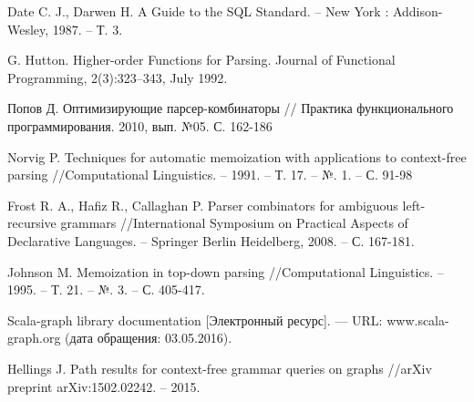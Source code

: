 \begin{thebibliography}{99}
Date C. J., Darwen H. A Guide to the SQL Standard. – New York :
Addison-Wesley, 1987. – Т. 3. 

G. Hutton. Higher-order Functions for Parsing. Journal of Functional
Programming, 2(3):323–343, July 1992.

Попов Д. Оптимизирующие парсер-комбинаторы // Практика
функционального программирования. 2010, вып. №05. С. 162-186

Norvig P. Techniques for automatic memoization with applications to
context-free parsing //Computational Linguistics. – 1991. – Т. 17. – №. 1. –
С. 91-98

Frost R. A., Hafiz R., Callaghan P. Parser combinators for
ambiguous left-recursive grammars //International Symposium on Practical
Aspects of Declarative Languages. – Springer Berlin Heidelberg, 2008. – С.
167-181.

Johnson M. Memoization in top-down parsing //Computational
Linguistics. – 1995. – Т. 21. – №. 3. – С. 405-417.

Scala-graph library documentation [Электронный ресурс]. — URL:
www.scala-graph.org (дата обращения: 03.05.2016).

Hellings J. Path results for context-free grammar queries on graphs
//arXiv preprint arXiv:1502.02242. – 2015.

\end{thebibliography}

